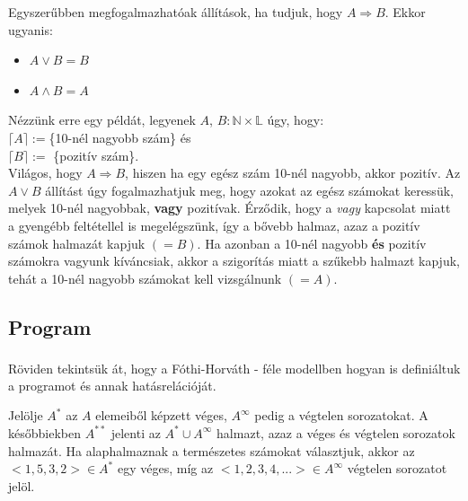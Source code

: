 \documentclass[12pt]{article}
\begin{document}
Egyszerűbben megfogalmazhatóak állítások, ha tudjuk, hogy $A \Rightarrow B$. Ekkor ugyanis:
\begin{itemize}
	\item $A \lor B = B$
	\item $A \land B = A$
\end{itemize}
Nézzünk erre egy példát, legyenek $A$, $B: \mathbb{N} \times \mathbb{L}$ úgy, hogy:\\
$\lceil A \rceil := $\{10-nél nagyobb szám\} és\\
$\lceil B \rceil := $ \{pozitív szám\}.\\
Világos, hogy $A \Rightarrow B$, hiszen ha egy egész szám 10-nél nagyobb, akkor pozitív.
Az $A \lor B$ állítást úgy fogalmazhatjuk meg, hogy azokat az egész számokat keressük, melyek 10-nél nagyobbak, \textbf{vagy} pozitívak. Érződik, hogy a \textit{vagy} kapcsolat miatt a gyengébb feltétellel is megelégszünk, így a bővebb halmaz, azaz a pozitív számok halmazát kapjuk $(=B)$. Ha azonban a 10-nél nagyobb \textbf{és} pozitív számokra vagyunk kíváncsiak, akkor a szigorítás miatt a szűkebb halmazt kapjuk, tehát a 10-nél nagyobb számokat kell vizsgálnunk $(=A)$.

\subsection{Program}

Röviden tekintsük át, hogy a Fóthi\textsuperscript{\cite{fothi_biblia}}-Horváth - féle modellben hogyan is definiáltuk a programot és annak hatásrelációját.

Jelölje $A^*$ az $A$ elemeiből képzett véges, $A^\infty$ pedig a végtelen sorozatokat. A későbbiekben $A^{**}$ jelenti az $A^* \cup A^{\infty}$ halmazt, azaz a véges és végtelen sorozatok halmazát. Ha alaphalmaznak a természetes számokat választjuk, akkor az $<1, 5, 3, 2> \in A^*$ egy véges, míg az $<1, 2, 3, 4, ...> \in A^{\infty}$ végtelen sorozatot jelöl.\\
\end{document}
